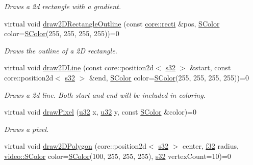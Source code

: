\begin{DoxyCompactItemize}
\begin{DoxyCompactList}\small\item\em Draws a 2d rectangle with a gradient. \end{DoxyCompactList}\item 
virtual void \hyperlink{classirr_1_1video_1_1IVideoDriver_a65efe36e19f0570988848175a8af7bd1}{draw2\+D\+Rectangle\+Outline} (const \hyperlink{namespaceirr_1_1core_a628365d56b9d3ca9c887cd7f651f7b45}{core\+::recti} \&pos, \hyperlink{classirr_1_1video_1_1SColor}{S\+Color} color=\hyperlink{classirr_1_1video_1_1SColor}{S\+Color}(255, 255, 255, 255))=0
\begin{DoxyCompactList}\small\item\em Draws the outline of a 2D rectangle. \end{DoxyCompactList}\item 
virtual void \hyperlink{classirr_1_1video_1_1IVideoDriver_a7b5388e319a0ae1340c3d81db02dd959}{draw2\+D\+Line} (const core\+::position2d$<$ \hyperlink{namespaceirr_ac66849b7a6ed16e30ebede579f9b47c6}{s32} $>$ \&start, const core\+::position2d$<$ \hyperlink{namespaceirr_ac66849b7a6ed16e30ebede579f9b47c6}{s32} $>$ \&end, \hyperlink{classirr_1_1video_1_1SColor}{S\+Color} color=\hyperlink{classirr_1_1video_1_1SColor}{S\+Color}(255, 255, 255, 255))=0
\begin{DoxyCompactList}\small\item\em Draws a 2d line. Both start and end will be included in coloring. \end{DoxyCompactList}\item 
virtual void \hyperlink{classirr_1_1video_1_1IVideoDriver_a6567ced74ed6dc8cb1b325493ae7a093}{draw\+Pixel} (\hyperlink{namespaceirr_a0416a53257075833e7002efd0a18e804}{u32} x, \hyperlink{namespaceirr_a0416a53257075833e7002efd0a18e804}{u32} y, const \hyperlink{classirr_1_1video_1_1SColor}{S\+Color} \&color)=0
\begin{DoxyCompactList}\small\item\em Draws a pixel. \end{DoxyCompactList}\item 
virtual void \hyperlink{classirr_1_1video_1_1IVideoDriver_aaf1318379f3d70c9347cfa853b944ad4}{draw2\+D\+Polygon} (core\+::position2d$<$ \hyperlink{namespaceirr_ac66849b7a6ed16e30ebede579f9b47c6}{s32} $>$ center, \hyperlink{namespaceirr_a0277be98d67dc26ff93b1a6a1d086b07}{f32} radius, \hyperlink{classirr_1_1video_1_1SColor}{video\+::\+S\+Color} color=\hyperlink{classirr_1_1video_1_1SColor}{S\+Color}(100, 255, 255, 255), \hyperlink{namespaceirr_ac66849b7a6ed16e30ebede579f9b47c6}{s32} vertex\+Count=10)=0

\end{DoxyCompactItemize}
